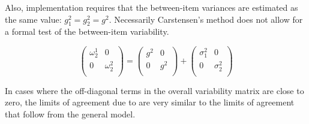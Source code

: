 \documentclass[12pt, a4paper]{report}
\theoremstyle{plain}
\theoremstyle{definition}
\theoremstyle{remark}
\begin{document}
	Also, implementation requires that the between-item variances are
	estimated as the same value: $g^2_1 = g^2_2 = g^2$. Necessarily
	Carstensen's method does not allow for a formal test of the
	between-item variability.
	
	\[\left(\begin{array}{cc}
	\omega^1_2  & 0 \\
	0 & \omega^2_2 \\
	\end{array}  \right)
	=  \left(
	\begin{array}{cc}
	g^2  & 0 \\
	0 & g^2 \\
	\end{array} \right)+
	\left(
	\begin{array}{cc}
	\sigma^2_1  & 0 \\
	0 & \sigma^2_2 \\
	\end{array}\right)
	\]
	
	In cases where the off-diagonal terms in the overall variability
	matrix are close to zero, the limits of agreement due to
	\citet{BXC2008} are very similar to the limits of agreement that
	follow from the general model.
	
	
	
\end{document}
